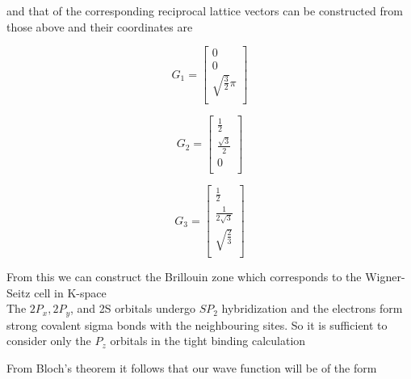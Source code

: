 \documentclass[a4paper]{article}
\begin{document}
and that of the corresponding reciprocal lattice vectors can be constructed from those above and their coordinates are \\
\begin{minipage}{0.3\textwidth}
    \centering
    \begin{equation*}
    G_1 =
    \begin{bmatrix}
        0 \\
        0 \\
        \sqrt{\frac{3}{2}}\pi \\
        
    \end{bmatrix}
    \end{equation*}
    
    \end{minipage}
    \begin{minipage}{0.3\textwidth}
    \centering
    \begin{equation*}
    G_2 =
    \begin{bmatrix}
        \frac{1}{2} \\
        \frac{\sqrt{3}}{2}  \\
        0 \\
    \end{bmatrix}
    \end{equation*}
    \end{minipage}
    \begin{minipage}{0.3\textwidth}
    \centering
    \begin{equation*}
    G_3 =
    \begin{bmatrix}
        \frac{1}{2} \\
        \frac{1}{2\sqrt{3}}  \\
        \sqrt{\frac{2}{3}} \\
    \end{bmatrix}
    \end{equation*}
    \end{minipage}

From this we can construct the Brillouin zone which corresponds to the Wigner-Seitz cell in K-space\\

The $2P_{x}, 2P_{y}$, and 2S orbitals undergo $SP_{2}$ hybridization and the electrons form strong covalent sigma bonds with the neighbouring sites. So it is sufficient to consider only the $P_{z}$ orbitals in the tight binding calculation

From Bloch's theorem it follows that our wave function will be of the form
\end{document}
